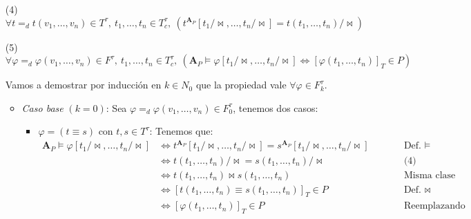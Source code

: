 \documentclass{article}
\begin{document}
\begin{enumerate}
  \item[(4)] $\forall t=_dt(v_1,\dots,v_n)\in T^\tau,\ t_1,\dots,t_n\in T^\tau_c,\ (t^{\mathbf{A}_P}[t_1/\!\bowtie,\dots,t_n/\!\bowtie]=t(t_1,\dots,t_n)/\!\bowtie)$
  \item[(5)] $\forall\varphi=_d\varphi(v_1,\dots,v_n)\in F^\tau,\ t_1,\dots,t_n\in T^\tau_c,\ (\mathbf{A}_P\vDash\varphi[t_1/\!\bowtie,\dots,t_n/\!\bowtie]\iff[\varphi(t_1,\dots,t_n)]_T\in P)$

        \vspace{0.3cm}
        Vamos a demostrar por inducción en $k\in N_0$ que la propiedad vale $\forall\varphi\in F^\tau_k$.
        \begin{itemize}
          \item \textit{Caso base} $(k=0)$: Sea $\varphi=_d\varphi(v_1,\dots,v_n)\in F^\tau_0$, tenemos dos casos:
                \begin{itemize}
                  \item $\varphi=(t\equiv s)$ con $t,s\in T^\tau$: Tenemos que:
                        \begin{equation*}
                          \begin{alignedat}{2}
                            \mathbf{A}_P\vDash\varphi[t_1/\!\bowtie,\dots,t_n/\!\bowtie] & \iff t^{\mathbf{A}_P}[t_1/\!\bowtie,\dots,t_n/\!\bowtie]=s^{\mathbf{A}_P}[t_1/\!\bowtie,\dots,t_n/\!\bowtie] &  & \qquad\text{Def. }\vDash  \\
                                                                                         & \iff t(t_1,\dots,t_n)/\!\bowtie=s(t_1,\dots,t_n)/\!\bowtie                                                   &  & \qquad\text{(4)}          \\
                                                                                         & \iff t(t_1,\dots,t_n)\bowtie s(t_1,\dots,t_n)                                                                &  & \qquad\text{Misma clase}  \\
                                                                                         & \iff [t(t_1,\dots,t_n)\equiv s(t_1,\dots,t_n)]_T\in P                                                        &  & \qquad\text{Def. }\bowtie \\
                                                                                         & \iff [\varphi(t_1,\dots,t_n)]_T\in P                                                                         &  & \qquad\text{Reemplazando}

\end{alignedat}
\end{equation*}
\end{itemize}
\end{itemize}
\end{enumerate}
\end{document}
